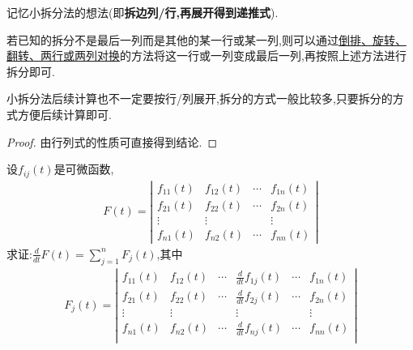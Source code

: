 \documentclass[lang=cn,newtx,10pt,scheme=chinese]{elegantbook}
\begin{document}
\begin{note}
    记忆小拆分法的想法(即\textbf{拆边列/行,再展开得到递推式}).
\end{note}
\begin{remark}
    若已知的拆分不是最后一列而是其他的某一行或某一列,则可以通过\hyperref[pro:行列式计算常识]{倒排、旋转、翻转、两行或两列对换}的方法将这一行或一列变成最后一列,再按照上述方法进行拆分即可.

    小拆分法后续计算也不一定要按行/列展开,拆分的方式一般比较多,只要拆分的方式方便后续计算即可. 
\end{remark}
\begin{proof}
    由行列式的性质可直接得到结论.
\end{proof}

\begin{proposition}[行列式的求导运算]\label{proposition:行列式的求导运算}
    设\(f_{ij}(t)\)是可微函数,
    \begin{align*}
F(t) = 
\left| \begin{matrix}
f_{11}(t) & f_{12}(t) & \cdots & f_{1n}(t) \\
f_{21}(t) & f_{22}(t) & \cdots & f_{2n}(t) \\
\vdots & \vdots &  & \vdots \\
f_{n1}(t) & f_{n2}(t) & \cdots & f_{nn}(t)
\end{matrix} \right| 
\nonumber
\end{align*}
求证:$\frac{d}{dt}F\left( t \right) =\sum_{j=1}^n{F_j\left( t \right)}$,其中
\begin{align*}
    F_{j}(t) = 
    \left| \begin{matrix}
        f_{11}(t)&		f_{12}(t)&		\cdots&		\frac{d}{dt}f_{1j}(t)&		\cdots&		f_{1n}(t)\\
        f_{21}(t)&		f_{22}(t)&		\cdots&		\frac{d}{dt}f_{2j}(t)&		\cdots&		f_{2n}(t)\\
        \vdots&		\vdots&		&		\vdots&		&		\vdots\\
        f_{n1}(t)&		f_{n2}(t)&		\cdots&		\frac{d}{dt}f_{nj}(t)&		\cdots&		f_{nn}(t)\\
    \end{matrix} \right| 
\nonumber
\end{align*}
\end{proposition}
\end{document}
